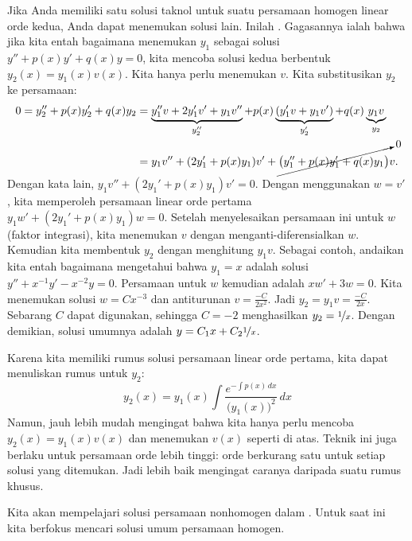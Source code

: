 Jika Anda memiliki satu solusi taknol untuk suatu persamaan homogen linear orde kedua, Anda dapat menemukan solusi lain. Inilah \emph{}. Gagasannya ialah bahwa jika kita entah bagaimana menemukan $y_1$ sebagai solusi $y'' + p(x) y' + q(x) y = 0$, kita mencoba solusi kedua berbentuk $y_2(x) = y_1(x) v(x)$.
Kita hanya perlu menemukan $v$. Kita substitusikan $y_2$ ke persamaan:
\begin{equation*}
\begin{split}
0 =
y_2'' + p(x) y_2' + q(x) y_2
& =
\underbrace{y_1'' v + 2 y_1' v' + y_1 v''}_{y_2''}
+ p(x) \underbrace{( y_1' v + y_1 v' )}_{y_2'}
+ q(x) \underbrace{y_1 v}_{y_2}
\\
& =
y_1 v''
+ (2 y_1' + p(x) y_1) v'
+
\cancelto{0}{\bigl( y_1'' + p(x) y_1' + q(x) y_1 \bigr)} v .
\end{split}
\end{equation*}
Dengan kata lain, $y_1 v'' + (2 y_1' + p(x) y_1) v' = 0$. Dengan menggunakan $w = v'$, kita memperoleh persamaan linear orde pertama $y_1 w' + (2 y_1' + p(x) y_1) w = 0$. Setelah menyelesaikan persamaan ini untuk $w$ (faktor integrasi), kita menemukan $v$ dengan menganti-diferensialkan $w$. Kemudian kita membentuk $y_2$ dengan menghitung $y_1v$. Sebagai contoh, andaikan kita entah bagaimana mengetahui bahwa $y_1 = x$ adalah solusi $y''+x^{-1}y'-x^{-2} y=0$.
Persamaan untuk $w$ kemudian adalah $xw' + 3 w = 0$. Kita menemukan solusi $w = Cx^{-3}$ dan antiturunan $v = \frac{-C}{2x^2}$. Jadi $y_2 = y_1 v = \frac{-C}{2x}$. Sebarang $C$ dapat digunakan, sehingga $C=-2$ menghasilkan $y_2 = \nicefrac{1}{x}$. Dengan demikian, solusi umumnya adalah $y = C_1 x + C_2\nicefrac{1}{x}$.

Karena kita memiliki rumus solusi persamaan linear orde pertama, kita dapat menuliskan rumus untuk $y_2$:
\begin{equation*}
y_2(x) = y_1(x) \int \frac{e^{-\int p(x)\,dx}}{{\bigl(y_1(x)\bigr)}^2} \,dx
\end{equation*}
Namun, jauh lebih mudah mengingat bahwa kita hanya perlu mencoba $y_2(x) = y_1(x) v(x)$ dan menemukan $v(x)$ seperti di atas. Teknik ini juga berlaku untuk persamaan orde lebih tinggi: orde berkurang satu untuk setiap solusi yang ditemukan. Jadi lebih baik mengingat caranya daripada suatu rumus khusus.

\medskip

Kita akan mempelajari solusi persamaan nonhomogen dalam . Untuk saat ini kita berfokus mencari solusi umum persamaan homogen.


